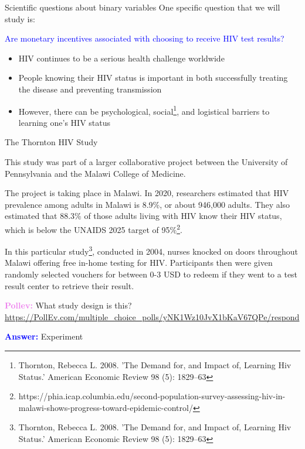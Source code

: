 \documentclass[10pt,t]{beamer}
\begin{document}
\begin{frame}{Scientific questions about binary variables}
	One specific question that we will study is:

		\bigskip
		
\textcolor{blue}{Are monetary incentives associated with choosing to receive HIV test results?}

	\vspace{0.7cm}
	
	\begin{itemize}
		\item HIV continues to be a serious health challenge worldwide
		\medskip
		
		\item People knowing their HIV status is important in both successfully treating the disease and preventing transmission
		
		\medskip
		
		\item However, there can be psychological, social\footnote{Thornton, Rebecca L. 2008. 'The Demand for, and Impact of, Learning Hiv Status.' American Economic Review 98 (5): 1829–63}, and logistical barriers to learning one's HIV status
	\end{itemize}
\end{frame}

\begin{frame}{The Thornton HIV Study}
	\vspace{-10 mm}
	
	This study was part of a larger collaborative project between the University of Pennsylvania and the Malawi College of Medicine.
	
	\medskip
	
	The project is taking place in Malawi. In 2020, researchers estimated that HIV prevalence among adults in Malawi is 8.9\%, or about 946,000 adults. They also estimated that 88.3\% of those adults living with HIV know their HIV status, which is below the UNAIDS 2025 target of 95\%\footnote{https://phia.icap.columbia.edu/second-population-survey-assessing-hiv-in-malawi-shows-progress-toward-epidemic-control/}.
	
	\medskip
	
	In this particular study\footnote{Thornton, Rebecca L. 2008. 'The Demand for, and Impact of, Learning Hiv Status.' American Economic Review 98 (5): 1829–63}, conducted in 2004, nurses knocked on doors throughout Malawi offering free in-home testing for HIV. Participants then were given randomly selected vouchers for between 0-3 USD to redeem if they went to a test result center to retrieve their result.
	
	\smallskip
	
	\textcolor{violet}{\textbf{Pollev:}} What study design is this?
	\tiny{\url{https://PollEv.com/multiple_choice_polls/yNK1Wz10JvX1bKaV67QPe/respond}}\pause
	\normalsize
	
	\textcolor{blue}{\textbf{Answer:}} Experiment
\end{frame}
\end{document}
